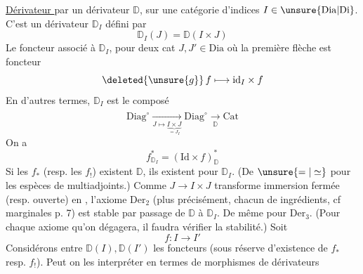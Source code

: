 \uline{Dérivateur } par un dérivateur $\mathbb D$, sur une catégorie d'indices $I\in\unsure{\mathrm{Dia}|\mathrm{Di}}$. C'est un dérivateur $\mathbb D_I$ défini par
\[
\mathbb D_I(J)=\mathbb D(I\times J)
\]
Le foncteur associé à $\mathbb D_I$, pour deux cat $J,J'\in\mathrm{Dia}$
où la première flèche est   foncteur
\[
\deleted{\unsure{g}}\, f\longmapsto\mathrm{id}_I\times f
\]
En d'autres termes, $\mathbb D_I$ est le composé
\[
\mathrm{Diag}^\circ
\xrightarrow[\displaystyle J\mapsto\underbrace{I\times J}_{=J_I}]{\phantom{\mathbb D}}
\mathrm{Diag}^\circ\xrightarrow[\mathbb D]{}\mathrm{Cat}
\]
On a
\[
f^*_{\mathbb D_I}=(\mathrm{Id}\times f)^*_{\mathbb D}
\]
Si les $f_*$ (resp. les $f_!$) existent  $\mathbb D$, ils existent pour $\mathbb D_I$. (De $\unsure{=|\simeq}$ pour les espèces de multiadjoints.) Comme $J\longrightarrow I\times J$ transforme immersion fermée (resp. ouverte) en , l'axiome $\mathrm{Der}_2$ (plus précisément, chacun de  ingrédients, cf  marginales p. 7) est stable par passage de $\mathbb D$ à $\mathbb D_I$. De même pour $\mathrm{Der}_3$. (Pour chaque  axiome qu'on dégagera, il faudra vérifier la stabilité.)
Soit
\[
f:I\longrightarrow I'
\]
Considérons entre $\mathbb D(I),\mathbb D(I')$ les foncteurs
(sous réserve d'existence de $f_*$ resp. $f_!$). Peut on les interpréter en termes de morphismes de dérivateurs
